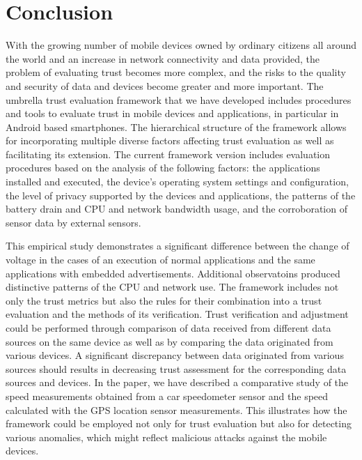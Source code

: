 \section{Conclusion}
With the growing number of mobile devices owned by ordinary citizens all around the world and an increase 
in network connectivity and data provided, the problem of evaluating trust becomes 
more complex, and the risks to
the quality and security of data and devices become greater and more important. The 
umbrella trust evaluation 
framework that we have developed includes procedures and tools to evaluate trust in mobile devices and applications, in particular in Android based smartphones. 
The  hierarchical structure of the framework allows for incorporating multiple diverse factors affecting trust evaluation as well as facilitating its extension.
The current framework version includes evaluation procedures based on the analysis of the following factors: the applications installed and executed, the device’s operating system settings and configuration, the level of privacy supported by the devices and applications, the patterns of the battery drain and CPU and network bandwidth usage,
and the corroboration of sensor data by external sensors.

This empirical study demonstrates a significant difference between the change of voltage in the cases of an execution 
of normal applications and the same applications with embedded advertisements.  Additional observatoins produced distinctive patterns of the CPU and network use.
The framework includes not only the trust metrics but also the rules for their combination into a trust
evaluation and the methods of its verification. 
Trust verification and adjustment could be performed through comparison of data received from different data sources on the 
same device as well as by comparing the data originated from various devices. A significant discrepancy between data 
originated from various sources should results in decreasing trust assessment for the corresponding data sources and devices. 
In the paper, we have described a comparative study of the speed measurements obtained from a car speedometer sensor 
and the speed calculated 
with the GPS location sensor measurements. This illustrates how the framework could be employed not only for trust evaluation 
but also for detecting various anomalies, which might reflect malicious attacks against the mobile devices.
